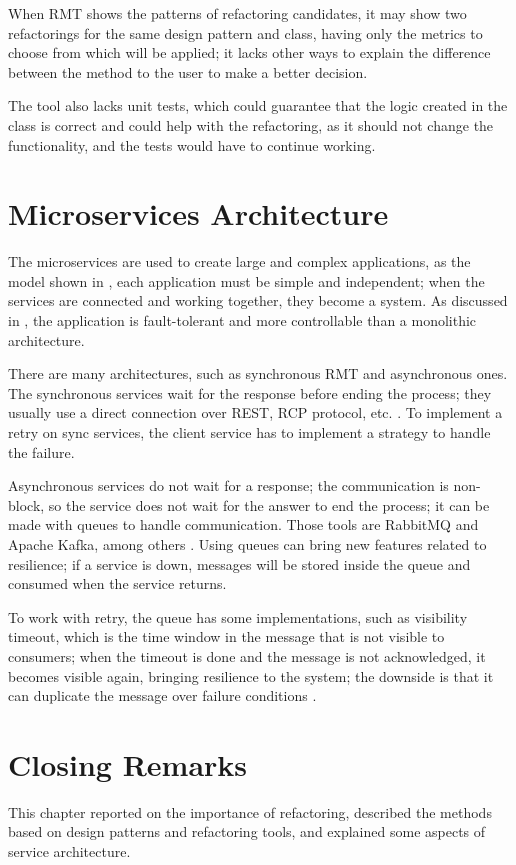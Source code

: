When RMT shows the patterns of refactoring candidates, it may show two refactorings for the same design pattern and class, having only the metrics to choose from which will be applied; it lacks other ways to explain the difference between the method to the user to make a better decision.

The tool also lacks unit tests, which could guarantee that the logic created in the class is correct and could help with the refactoring, as it should not change the functionality, and the tests would have to continue working.

\section{Microservices Architecture}
\label{sec-microservices}
The microservices are used to create large and complex applications, as the model shown in , each application must be simple and independent; when the services are connected and working together, they become a system. As discussed in \textcite{microservices-comuni}, the application is fault-tolerant and more controllable than a monolithic architecture.

There are many architectures, such as synchronous RMT and asynchronous ones. The synchronous services wait for the response before ending the process; they usually use a direct connection over REST, RCP protocol, etc. \cite{microservices-comuni}. To implement a retry on sync services, the client service has to implement a strategy to handle the failure.

Asynchronous services do not wait for a response; the communication is non-block, so the service does not wait for the answer to end the process; it can be made with queues to handle communication. Those tools are RabbitMQ and Apache Kafka, among others \textcite{KARABEYAKSAKALLI2021111014}. Using queues can bring new features related to resilience; if a service is down, messages will be stored inside the queue and consumed when the service returns\cite{Cebeci2020DesignOA}. 

To work with retry, the queue has some implementations, such as visibility timeout, which is the time window in the message that is not visible to consumers; when the timeout is done and the message is not acknowledged, it becomes visible again, bringing resilience to the system; the downside is that it can duplicate the message over failure conditions \cite{ChenScalable}.

\section{Closing Remarks}
\label{sec2-remarks}
This chapter reported on the importance of refactoring, described the methods based on design patterns and refactoring tools, and explained some aspects of service architecture.

